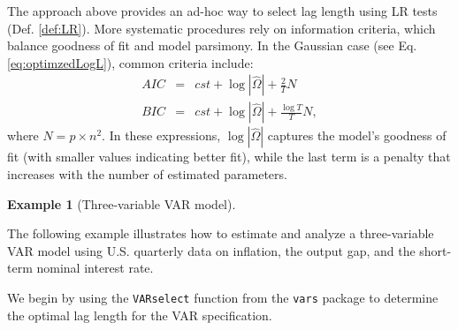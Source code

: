 \documentclass[
  11pt,
]{book}
\newenvironment{Shaded}{\begin{snugshade}}{\end{snugshade}}
\newcommand{\CommentTok}[1]{\textcolor[rgb]{0.56,0.35,0.01}{\textit{#1}}}
\newcommand{\FunctionTok}[1]{\textcolor[rgb]{0.13,0.29,0.53}{\textbf{#1}}}
\newcommand{\NormalTok}[1]{#1}
\newcommand{\OtherTok}[1]{\textcolor[rgb]{0.56,0.35,0.01}{#1}}
\newcommand{\SpecialCharTok}[1]{\textcolor[rgb]{0.81,0.36,0.00}{\textbf{#1}}}
\newcommand{\StringTok}[1]{\textcolor[rgb]{0.31,0.60,0.02}{#1}}
\theoremstyle{definition}
\theoremstyle{definition}
\newtheorem{example}{Example}[chapter]
\theoremstyle{definition}
\theoremstyle{definition}
\theoremstyle{remark}
\begin{document}
The approach above provides an ad-hoc way to select lag length using LR tests (Def. \ref{def:LR}).
More systematic procedures rely on information criteria, which balance goodness of fit and model parsimony.
In the Gaussian case (see Eq. \eqref{eq:optimzedLogL}), common criteria include:
\begin{eqnarray*}
AIC & = & cst + \log\left|\hat{\Omega}\right| + \frac{2}{T}N \\
BIC & = & cst + \log\left|\hat{\Omega}\right| + \frac{\log T}{T}N,
\end{eqnarray*}
where \(N = p \times n^2\). In these expressions, \(\log|\hat{\Omega}|\) captures the model's goodness of fit (with smaller values indicating better fit), while the last term is a penalty that increases with the number of estimated parameters.

\begin{example}[Three-variable VAR model]
\protect\hypertarget{exm:US3varselect}{}\label{exm:US3varselect}

The following example illustrates how to estimate and analyze a three-variable VAR model using U.S. quarterly data on inflation, the output gap, and the short-term nominal interest rate.

We begin by using the \texttt{VARselect} function from the \texttt{vars} package to determine the optimal lag length for the VAR specification.

\begin{Shaded}
\end{Shaded}
\end{example}
\end{document}
